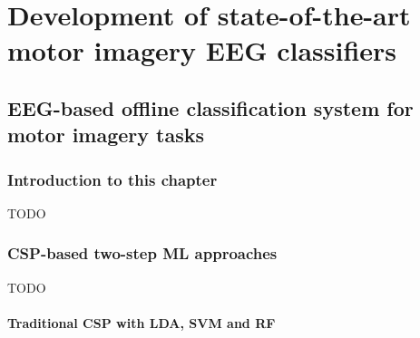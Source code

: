 






\part{Development of state-of-the-art motor imagery EEG classifiers}
\label{part:development}

\chapter{EEG-based offline classification system for motor imagery tasks}
\label{ch:offline_bci_system}

\section{Introduction to this chapter}
\label{sec:offline_bci_system_introduction}

TODO

\section{CSP-based two-step ML approaches}
\label{sec:offline_bci_system_two_step_ml}

TODO


\subsection{Traditional CSP with LDA, SVM and RF}
\label{subsec:offline_bci_system_two_step_ml_basic_csp}


